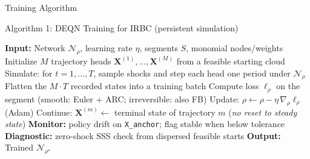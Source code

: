 \documentclass[aspectratio=169,11pt]{beamer}
\begin{document}
\begin{frame}{Training Algorithm}
\begin{block}{Algorithm 1: DEQN Training for IRBC (persistent simulation)}
\begin{algorithmic}
\footnotesize
\STATE \textbf{Input:} Network $\mathcal{N}_\rho$, learning rate $\eta$, segments $S$, monomial nodes/weights
\STATE Initialize $M$ trajectory heads $\bm{X}^{(1)}, \ldots, \bm{X}^{(M)}$ from a feasible starting cloud
    \STATE Simulate: for $t = 1, \ldots, T$, sample shocks and step each head one period under $\mathcal{N}_\rho$
    \STATE Flatten the $M\!\cdot\!T$ recorded states into a training batch
        \STATE Compute loss $\ell_\rho$ on the segment (smooth: Euler + ARC; irreversible: also FB)
        \STATE Update: $\rho \leftarrow \rho - \eta\,\nabla_\rho \ell_\rho$ (Adam)
    \ENDFOR
    \STATE Continue: $\bm{X}^{(m)} \leftarrow$ terminal state of trajectory $m$ (\emph{no reset to steady state})
    \STATE \textbf{Monitor:} policy drift on \texttt{X\_anchor}; flag stable when below tolerance
\ENDFOR
\STATE \textbf{Diagnostic:} zero-shock SSS check from dispersed feasible starts
\STATE \textbf{Output:} Trained $\mathcal{N}_{\rho^\star}$
\end{algorithmic}
\end{block}
\end{frame}
\end{document}
